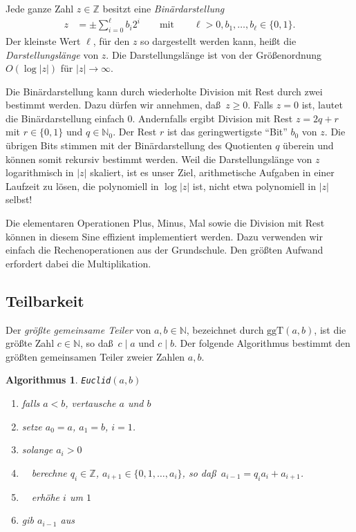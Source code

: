 \documentclass[10pt,reqno]{amsart}
\numberwithin{equation}{section}
\newcommand\ggt{\ggT}
\newcommand\ggT{\mathrm{ggT}}
\newcommand\NN{\mathbb N}
\newcommand\ZZ{\mathbb Z}
\newtheorem{algorithm}[definition]{Algorithmus}
\begin{document}
Jede ganze Zahl $z\in\ZZ$ besitzt eine {\em Bin\"ardarstellung}
	\begin{align*}
		z&=\pm\sum_{i=0}^\ell b_i2^i\qquad\mbox{mit}\qquad \ell>0,b_1,\ldots,b_\ell\in\{0,1\}.
	\end{align*}
Der kleinste Wert $\ell$, f\"ur den $z$ so dargestellt werden kann, hei\ss t die {\em Darstellungsl\"ange} von $z$.
Die Darstellungsl\"ange ist von der Gr\"o\ss enordnung $O(\log|z|)$ f\"ur $|z|\to\infty$.

Die Bin\"ardarstellung kann durch wiederholte Division mit Rest durch zwei bestimmt werden.
Dazu d\"urfen wir annehmen, da\ss\ $z\geq0$.
Falls $z=0$ ist, lautet die Bin\"ardarstellung einfach $0$.
Andernfalls ergibt Division mit Rest $z=2q+r$ mit $r\in\{0,1\}$ und $q\in\NN_0$.
Der Rest $r$ ist das geringwertigste ``Bit'' $b_0$ von $z$.
Die \"ubrigen Bits stimmen mit der Bin\"ardarstellung des Quotienten $q$ \"uberein und k\"onnen somit rekursiv bestimmt werden.
Weil die Darstellungsl\"ange von $z$ logarithmisch in $|z|$ skaliert, ist es unser Ziel, arithmetische Aufgaben in einer Laufzeit zu l\"osen, die polynomiell in $\log|z|$ ist, nicht etwa polynomiell in $|z|$ selbst!

Die elementaren Operationen Plus, Minus, Mal sowie die Division mit Rest k\"onnen in diesem Sine effizient implementiert werden.
Dazu verwenden wir einfach die Rechenoperationen aus der Grundschule.
Den gr\"o\ss ten Aufwand erfordert dabei die Multiplikation.

\subsection{Teilbarkeit}\label{sec_div}
Der {\em gr\"o\ss te gemeinsame Teiler} von $a,b\in\NN$, bezeichnet durch $\ggt(a,b)$, ist die gr\"o\ss te Zahl $c\in\NN$, so da\ss\ $c\mid a$ und $c\mid b$.
Der folgende Algorithmus bestimmt den gr\"o\ss ten gemeinsamen Teiler zweier Zahlen $a,b$.

\begin{algorithm}
	{\tt Euclid}$(a,b)$
	\begin{enumerate}
		\item falls $a<b$, vertausche $a$ und $b$
		\item setze $a_0=a$, $a_1=b$, $i=1$.
		\item solange $a_i>0$
		\item $\quad$berechne $q_i\in\ZZ$, $a_{i+1}\in\{0,1,\ldots,a_i\}$, so da\ss\ $a_{i-1}=q_ia_i+a_{i+1}$.
		\item $\quad$erh\"ohe $i$ um $1$
		\item gib $a_{i-1}$ aus
	\end{enumerate}
\end{algorithm}
\end{document}
